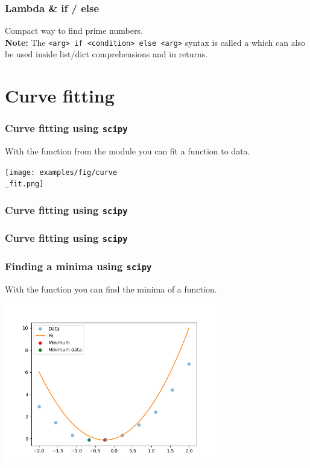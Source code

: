 \documentclass{beamer}
\begin{document}
\begin{frame}
  \frametitle{Lambda \& if / else}
  Compact way to find prime numbers.\\
  
  \textbf{Note:} The \texttt{<arg> if <condition> else <arg>} syntax is called a  which can also be used inside list/dict comprehensions and in returns.
\end{frame}
\section{Curve fitting}
\begin{frame}
  \frametitle{Curve fitting using \texttt{scipy}}
  With the \texttt{} function from the \texttt{} module you can fit a function to data.\\
  \begin{center}
    \texttt{[image: examples/fig/curve\\\_fit.png]}
  \end{center}
\end{frame}
\begin{frame}
  \frametitle{Curve fitting using \texttt{scipy}}
  
\end{frame}
\begin{frame}
  \frametitle{Curve fitting using \texttt{scipy}}
  
\end{frame}
\begin{frame}
  \frametitle{Finding a minima using \texttt{scipy}}
  With the \texttt{} function you can find the minima of a function.\\
  \begin{center}
    \includegraphics[width=0.7\textwidth]{examples/fig/fmin.png}
  \end{center}
\end{frame}
\end{document}
